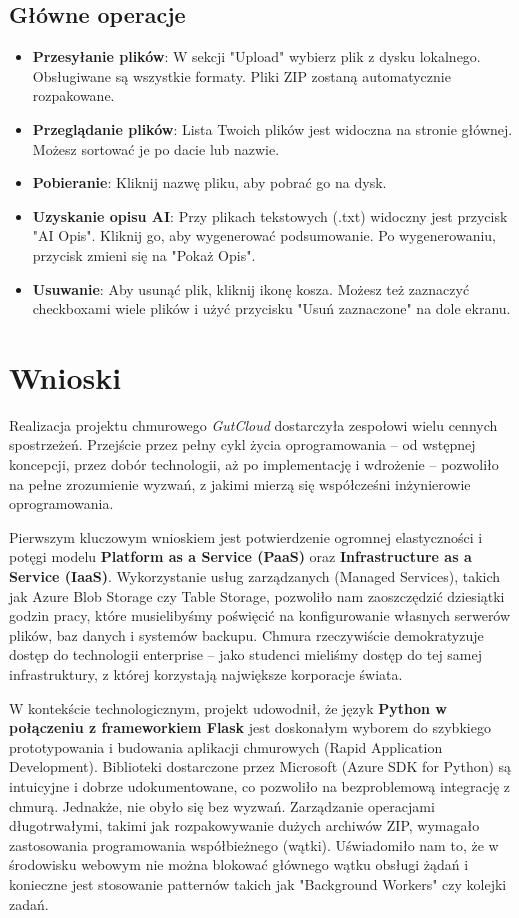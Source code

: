 \documentclass[12pt,a4paper]{article}
\begin{document}
	\subsection{Główne operacje}
	\begin{itemize}
		\item \textbf{Przesyłanie plików}: W sekcji "Upload" wybierz plik z dysku lokalnego. Obsługiwane są wszystkie formaty. Pliki ZIP zostaną automatycznie rozpakowane.
		\item \textbf{Przeglądanie plików}: Lista Twoich plików jest widoczna na stronie głównej. Możesz sortować je po dacie lub nazwie.
		\item \textbf{Pobieranie}: Kliknij nazwę pliku, aby pobrać go na dysk.
		\item \textbf{Uzyskanie opisu AI}: Przy plikach tekstowych (.txt) widoczny jest przycisk "AI Opis". Kliknij go, aby wygenerować podsumowanie. Po wygenerowaniu, przycisk zmieni się na "Pokaż Opis".
		\item \textbf{Usuwanie}: Aby usunąć plik, kliknij ikonę kosza. Możesz też zaznaczyć checkboxami wiele plików i użyć przycisku "Usuń zaznaczone" na dole ekranu.
	\end{itemize}
	
	\newpage
	\section{Wnioski}
	Realizacja projektu chmurowego \textit{GutCloud} dostarczyła zespołowi wielu cennych spostrzeżeń. Przejście przez pełny cykl życia oprogramowania – od wstępnej koncepcji, przez dobór technologii, aż po implementację i wdrożenie – pozwoliło na pełne zrozumienie wyzwań, z jakimi mierzą się współcześni inżynierowie oprogramowania.
	
	Pierwszym kluczowym wnioskiem jest potwierdzenie ogromnej elastyczności i potęgi modelu \textbf{Platform as a Service (PaaS)} oraz \textbf{Infrastructure as a Service (IaaS)}. Wykorzystanie usług zarządzanych (Managed Services), takich jak Azure Blob Storage czy Table Storage, pozwoliło nam zaoszczędzić dziesiątki godzin pracy, które musielibyśmy poświęcić na konfigurowanie własnych serwerów plików, baz danych i systemów backupu. Chmura rzeczywiście demokratyzuje dostęp do technologii enterprise – jako studenci mieliśmy dostęp do tej samej infrastruktury, z której korzystają największe korporacje świata.
	
	W kontekście technologicznym, projekt udowodnił, że język \textbf{Python w połączeniu z frameworkiem Flask} jest doskonałym wyborem do szybkiego prototypowania i budowania aplikacji chmurowych (Rapid Application Development). Biblioteki dostarczone przez Microsoft (Azure SDK for Python) są intuicyjne i dobrze udokumentowane, co pozwoliło na bezproblemową integrację z chmurą. Jednakże, nie obyło się bez wyzwań. Zarządzanie operacjami długotrwałymi, takimi jak rozpakowywanie dużych archiwów ZIP, wymagało zastosowania programowania współbieżnego (wątki). Uświadomiło nam to, że w środowisku webowym nie można blokować głównego wątku obsługi żądań i konieczne jest stosowanie patternów takich jak "Background Workers" czy kolejki zadań.
	
\end{document}
